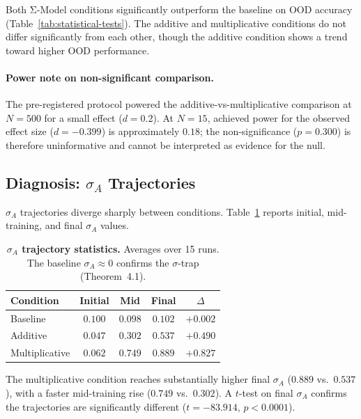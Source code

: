 \documentclass[10pt]{article}
\begin{document}
Both Σ-Model conditions significantly outperform the baseline on OOD
accuracy (Table~\ref{tab:statistical-tests}). The additive and multiplicative conditions do not differ
significantly from each other, though the additive condition shows a
trend toward higher OOD performance.

\paragraph{Power note on non-significant comparison.}
The pre-registered protocol powered the additive-vs-multiplicative
comparison at $N = 500$ for a small effect ($d = 0.2$). At $N = 15$,
achieved power for the observed effect size ($d = -0.399$) is
approximately $0.18$; the non-significance ($p = 0.300$) is therefore
uninformative and cannot be interpreted as evidence for the null.

\subsection{Diagnosis: \texorpdfstring{$\sigma_A$}{sigma\_A} Trajectories}

$\sigma_A$ trajectories diverge sharply between conditions.
Table~\ref{tab:sigma-trajectories} reports initial, mid-training, and
final $\sigma_A$ values.

\begin{table}[htbp]
\centering
\caption{\textbf{$\sigma_A$ trajectory statistics.} Averages over 15 runs.
The baseline $\sigma_A \approx 0$ confirms the $\sigma$-trap
(Theorem~4.1).}
\label{tab:sigma-trajectories}
\begin{tabular}{l c c c c}
\toprule
\textbf{Condition} & \textbf{Initial} & \textbf{Mid} & \textbf{Final} & \textbf{$\Delta$} \\
\midrule
Baseline     & $0.100$ & $0.098$ & $0.102$ & $+0.002$ \\
Additive     & $0.047$ & $0.302$ & $0.537$ & $+0.490$ \\
Multiplicative & $0.062$ & $0.749$ & $0.889$ & $+0.827$ \\
\bottomrule
\end{tabular}
\end{table}

The multiplicative condition reaches substantially higher final
$\sigma_A$ ($0.889$ vs.\ $0.537$), with a faster mid-training rise
($0.749$ vs.\ $0.302$). A $t$-test on final $\sigma_A$ confirms the
trajectories are significantly different ($t = -83.914$, $p < 0.0001$).
\end{document}
